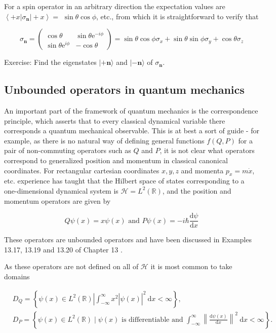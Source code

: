 \documentclass[10pt]{article}
\begin{document}
For a spin operator in an arbitrary direction the expectation values are $\left\langle+x\left|\sigma_{\mathbf{n}}\right|+x\right\rangle=$ $\sin \theta \cos \phi$, etc., from which it is straightforward to verify that

$$
\sigma_{\mathbf{n}}=\left(\begin{array}{cc}
\cos \theta & \sin \theta \mathrm{e}^{-i \phi} \\
\sin \theta \mathrm{e}^{i \phi} & -\cos \theta
\end{array}\right)=\sin \theta \cos \phi \sigma_{x}+\sin \theta \sin \phi \sigma_{y}+\cos \theta \sigma_{z}
$$

Exercise: Find the eigenstates $|+\mathbf{n}\rangle$ and $|-\mathbf{n}\rangle$ of $\sigma_{\mathbf{n}}$.

\subsection{Unbounded operators in quantum mechanics}
An important part of the framework of quantum mechanics is the correspondence principle, which asserts that to every classical dynamical variable there corresponds a quantum mechanical observable. This is at best a sort of guide - for example, as there is no natural way of defining general functions $f(Q, P)$ for a pair of non-commuting operators such as $Q$ and $P$, it is not clear what operators correspond to generalized position and momentum in classical canonical coordinates. For rectangular cartesian coordinates $x, y, z$ and momenta $p_{x}=m \dot{x}$, etc. experience has taught that the Hilbert space of states corresponding to a one-dimensional dynamical system is $\mathcal{H}=L^{2}(\mathbb{R})$, and the position and momentum operators are given by

$$
Q \psi(x)=x \psi(x) \text { and } P \psi(x)=-i \hbar \frac{\mathrm{d} \psi}{\mathrm{d} x}
$$

These operators are unbounded operators and have been discussed in Examples 13.17, 13.19 and 13.20 of Chapter 13 .

As these operators are not defined on all of $\mathcal{H}$ it is most common to take domains

$$
\begin{aligned}
& D_{Q}=\left\{\left.\psi(x) \in L^{2}(\mathbb{R})\left|\int_{-\infty}^{\infty} x^{2}\right| \psi(x)\right|^{2} \mathrm{~d} x<\infty\right\}, \\
& D_{P}=\left\{\psi(x) \in L^{2}(\mathbb{R}) \mid \psi(x) \text { is differentiable and } \int_{-\infty}^{\infty}\left\|\frac{\mathrm{d} \psi(x)}{\mathrm{d} x}\right\|^{2} \mathrm{~d} x<\infty\right\} .
\end{aligned}
$$
\end{document}
